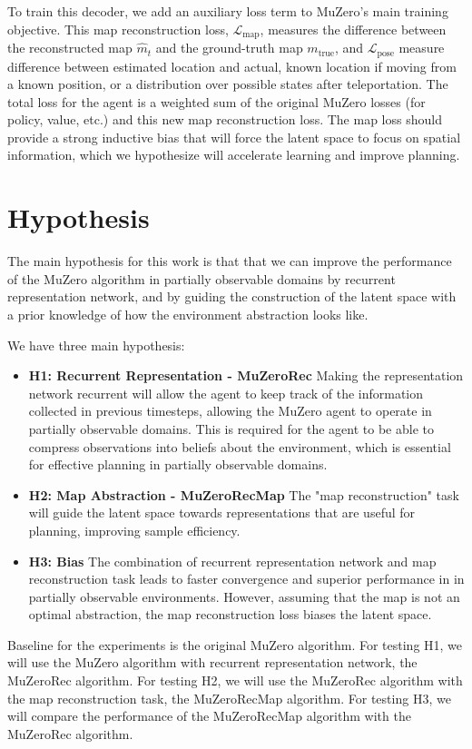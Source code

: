 \documentclass[12pt]{article}
\begin{document}
To train this decoder, we add an auxiliary loss term to MuZero's main training objective. This map reconstruction loss, $\mathcal{L}_{\text{map}}$, measures the difference between the reconstructed map $\hat{m}_t$ and the ground-truth map $m_{\text{true}}$, and $\mathcal{L}_{\text{pose}}$ measure difference between estimated location and actual, known location if moving from a known position, or a distribution over possible states after teleportation. 
The total loss for the agent is a weighted sum of the original MuZero losses (for policy, value, etc.) and this new map reconstruction loss. The map loss should provide a strong inductive bias that will force the latent space to focus on spatial information, which we hypothesize will accelerate learning and improve planning.

\section{Hypothesis}
The main hypothesis for this work is that that we can improve the performance of the MuZero algorithm in partially observable domains by recurrent representation network, and by guiding the construction of the latent space with a prior knowledge of how the environment abstraction looks like.

We have three main hypothesis:
\begin{itemize}
    \item \textbf{H1: Recurrent Representation - MuZeroRec} Making the representation network recurrent will allow the agent to keep track of the information collected in previous timesteps, allowing the MuZero agent to operate in partially observable domains. This is required for the agent to be able to compress observations into beliefs about the environment, which is essential for effective planning in partially observable domains.
    \item \textbf{H2: Map Abstraction - MuZeroRecMap} The "map reconstruction" task will guide the latent space towards representations that are useful for planning, improving sample efficiency.
    \item \textbf{H3: Bias} The combination of recurrent representation network and map reconstruction task leads to faster convergence and superior performance in in partially observable environments. However, assuming that the map is not an optimal abstraction, the map reconstruction loss biases the latent space. 
\end{itemize}

Baseline for the experiments is the original MuZero algorithm. For testing H1, we will use the MuZero algorithm with recurrent representation network, the MuZeroRec algorithm. For testing H2, we will use the MuZeroRec algorithm with the map reconstruction task, the MuZeroRecMap algorithm. For testing H3, we will compare the performance of the MuZeroRecMap algorithm with the MuZeroRec algorithm. 
\end{document}
